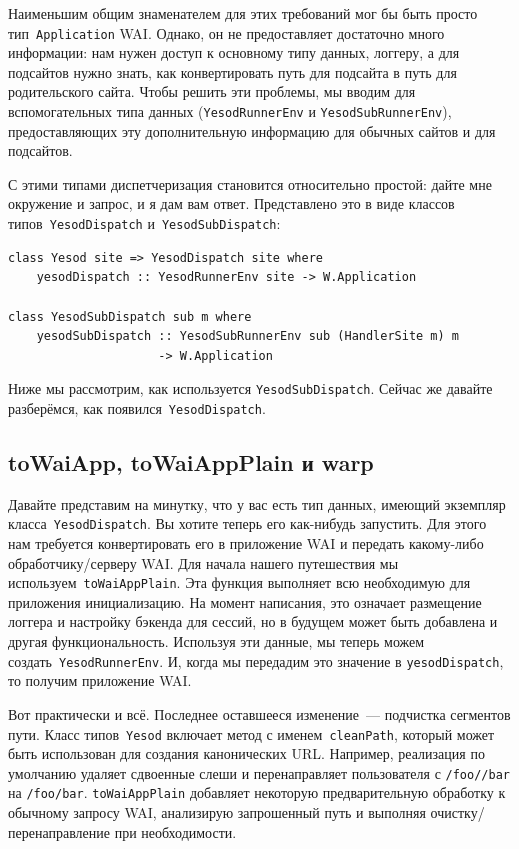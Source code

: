 Наименьшим общим знаменателем для этих требований мог бы быть просто
тип~\lstinline'Application' WAI. Однако, он не предоставляет достаточно много
информации: нам нужен доступ к основному типу данных, логгеру, а для подсайтов
нужно знать, как конвертировать путь для подсайта в путь для родительского
сайта. Чтобы решить эти проблемы, мы вводим для вспомогательных типа данных
(\lstinline'YesodRunnerEnv' и \lstinline'YesodSubRunnerEnv'), предоставляющих
эту дополнительную информацию для обычных сайтов и для подсайтов.

С этими типами диспетчеризация становится относительно простой: дайте мне
окружение и запрос, и я дам вам ответ. Представлено это в виде классов
типов~\lstinline'YesodDispatch' и~\lstinline'YesodSubDispatch':
\begin{lstlisting}
class Yesod site => YesodDispatch site where
    yesodDispatch :: YesodRunnerEnv site -> W.Application

class YesodSubDispatch sub m where
    yesodSubDispatch :: YesodSubRunnerEnv sub (HandlerSite m) m
                     -> W.Application
\end{lstlisting}

Ниже мы рассмотрим, как используется \lstinline'YesodSubDispatch'. Сейчас же
давайте разберёмся, как появился~\lstinline'YesodDispatch'.

\subsection{toWaiApp, toWaiAppPlain и warp}
Давайте представим на минутку, что у вас есть тип данных, имеющий экземпляр
класса~\lstinline'YesodDispatch'. Вы хотите теперь его как-нибудь запустить.
Для этого нам требуется конвертировать его в приложение WAI и передать
какому-либо обработчику/серверу WAI. Для начала нашего путешествия мы
используем~\lstinline'toWaiAppPlain'. Эта функция выполняет всю необходимую для
приложения инициализацию. На момент написания, это означает размещение логгера
и настройку бэкенда для сессий, но в будущем может быть добавлена и другая
функциональность. Используя эти данные, мы теперь можем
создать~\lstinline'YesodRunnerEnv'. И, когда мы передадим это значение в
\lstinline'yesodDispatch', то получим приложение WAI.

Вот практически и всё. Последнее оставшееся изменение~--- подчистка сегментов
пути. Класс типов~\lstinline'Yesod' включает метод с
именем~\lstinline'cleanPath', который может быть использован для создания
канонических URL. Например, реализация по умолчанию удаляет сдвоенные слеши и
перенаправляет пользователя с \texttt{/foo//bar} на \texttt{/foo/bar}.
\lstinline'toWaiAppPlain' добавляет некоторую предварительную обработку к
обычному запросу WAI, анализирую запрошенный путь и выполняя
очистку/перенаправление при необходимости.

